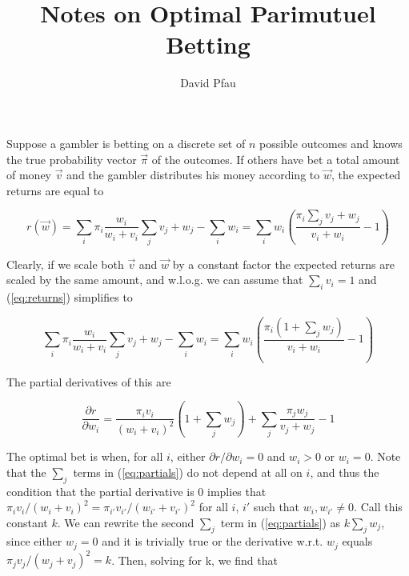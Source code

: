 \documentclass[11pt]{article}
\title{Notes on Optimal Parimutuel Betting}
\author{David Pfau}
\begin{document}
\maketitle

Suppose a gambler is betting on a discrete set of $n$ possible outcomes and knows the true probability vector $\vec{\pi}$ of the outcomes.  If others have bet a total amount of money $\vec{v}$ and the gambler distributes his money according to $\vec{w}$, the expected returns are equal to 

\begin{equation}
r(\vec{w}) = \sum_i \pi_i \frac{w_i}{w_i + v_i} \sum_{j} v_j + w_j - \sum_i w_i = \sum_i w_i \left( \frac{\pi_i \sum_j v_j + w_j}{v_i + w_i} - 1\right)
\label{eq:returns}
\end{equation}

Clearly, if we scale both $\vec{v}$ and $\vec{w}$ by a constant factor the expected returns are scaled by the same amount, and w.l.o.g. we can assume that $\sum_i v_i = 1$ and (\ref{eq:returns}) simplifies to 

\begin{equation}
\sum_i \pi_i \frac{w_i}{w_i + v_i} \sum_{j} v_j + w_j - \sum_i w_i = \sum_i w_i \left( \frac{\pi_i (1+ \sum_j w_j)}{v_i + w_i} - 1\right)
\label{eq:normal_returns}
\end{equation}

The partial derivatives of this are

\begin{equation}
\frac{\partial r}{\partial w_i}=\frac{\pi_i v_i}{(w_i + v_i)^2}\left(1+\sum_j w_j\right) + \sum_j \frac{\pi_j w_j}{v_j + w_j} - 1
\label{eq:partials}
\end{equation}

The optimal bet is when, for all $i$, either $\partial r/\partial w_i = 0$ and $w_i > 0$ or $w_i = 0$.  Note that the $\sum_j$ terms in (\ref{eq:partials}) do not depend at all on $i$, and thus the condition that the partial derivative is 0 implies that $\pi_i v_i/(w_i+v_i)^2 = \pi_{i'} v_{i'}/(w_{i'} + v_{i'})^2$ for all $i$, $i'$ such that $w_i, w_{i'} \ne 0$.  Call this constant $k$.  We can rewrite the second $\sum_j$ term in (\ref{eq:partials}) as $k\sum_j w_j$, since either $w_j = 0$ and it is trivially true or the derivative w.r.t. $w_j$ equals $\pi_j v_j/(w_j + v_j)^2 = k$.  Then, solving for k, we find that
\end{document}
